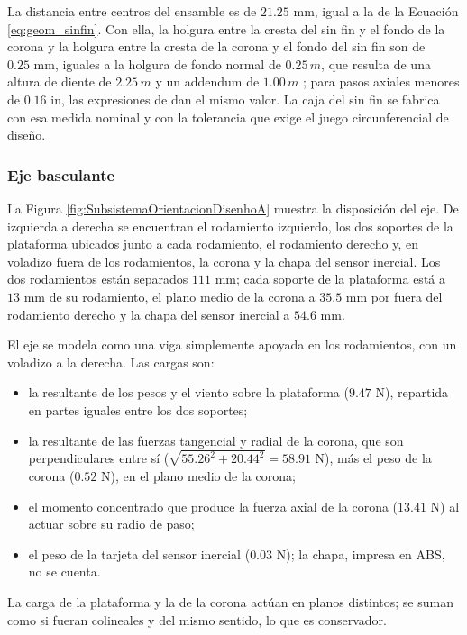 \documentclass[../../General.tex]{subfiles}
\begin{document}
La distancia entre centros del ensamble es de $21.25\text{ mm}$, igual a la de la Ecuación \ref{eq:geom_sinfin}. Con ella, la holgura entre la cresta del sin fin y el fondo de la corona y la holgura entre la cresta de la corona y el fondo del sin fin son de $0.25\text{ mm}$, iguales a la holgura de fondo normal de $0.25\,m$, que resulta de una altura de diente de $2.25\,m$ y un addendum de $1.00\,m$ \citep{khk_gear_ref}; para pasos axiales menores de $0.16\text{ in}$, las expresiones de \citet{Shigley11th} dan el mismo valor. La caja del sin fin se fabrica con esa medida nominal y con la tolerancia que exige el juego circunferencial de diseño.

\subsubsection{Eje basculante}

La Figura \ref{fig:SubsistemaOrientacionDisenhoA} muestra la disposición del eje. De izquierda a derecha se encuentran el rodamiento izquierdo, los dos soportes de la plataforma ubicados junto a cada rodamiento, el rodamiento derecho y, en voladizo fuera de los rodamientos, la corona y la chapa del sensor inercial. Los dos rodamientos están separados $111\text{ mm}$; cada soporte de la plataforma está a $13\text{ mm}$ de su rodamiento, el plano medio de la corona a $35.5\text{ mm}$ por fuera del rodamiento derecho y la chapa del sensor inercial a $54.6\text{ mm}$.

El eje se modela como una viga simplemente apoyada en los rodamientos, con un voladizo a la derecha. Las cargas son:
\begin{itemize}
    \item la resultante de los pesos y el viento sobre la plataforma ($9.47\text{ N}$), repartida en partes iguales entre los dos soportes;
    \item la resultante de las fuerzas tangencial y radial de la corona, que son perpendiculares entre sí ($\sqrt{55.26^2 + 20.44^2} = 58.91\text{ N}$), más el peso de la corona ($0.52\text{ N}$), en el plano medio de la corona;
    \item el momento concentrado que produce la fuerza axial de la corona ($13.41\text{ N}$) al actuar sobre su radio de paso;
    \item el peso de la tarjeta del sensor inercial ($0.03\text{ N}$); la chapa, impresa en ABS, no se cuenta.
\end{itemize}
La carga de la plataforma y la de la corona actúan en planos distintos; se suman como si fueran colineales y del mismo sentido, lo que es conservador.
\end{document}
